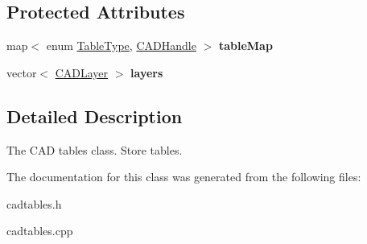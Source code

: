 \subsection*{Protected Attributes}
\begin{DoxyCompactItemize}
\item 
map$<$ enum \hyperlink{class_c_a_d_tables_a83b3acba13e77ca6961fcc4a2b85ddb5}{Table\+Type}, \hyperlink{class_c_a_d_handle}{C\+A\+D\+Handle} $>$ {\bfseries table\+Map}\hypertarget{class_c_a_d_tables_a3dbbb4335767a3217596004237a9b636}{}\label{class_c_a_d_tables_a3dbbb4335767a3217596004237a9b636}

\item 
vector$<$ \hyperlink{class_c_a_d_layer}{C\+A\+D\+Layer} $>$ {\bfseries layers}\hypertarget{class_c_a_d_tables_ac0a73fea4bd1e3d1f327231544dffdb3}{}\label{class_c_a_d_tables_ac0a73fea4bd1e3d1f327231544dffdb3}

\end{DoxyCompactItemize}


\subsection{Detailed Description}
The C\+AD tables class. Store tables. 

The documentation for this class was generated from the following files\+:\begin{DoxyCompactItemize}
\item 
cadtables.\+h\item 
cadtables.\+cpp\end{DoxyCompactItemize}
